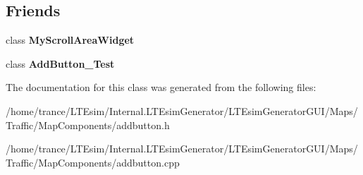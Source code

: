 \subsection*{Friends}
\begin{DoxyCompactItemize}
\item 
class {\bfseries My\+Scroll\+Area\+Widget}\hypertarget{class_add_button_a96efa7b91da8b371cdcf311988e63048}{}\label{class_add_button_a96efa7b91da8b371cdcf311988e63048}

\item 
class {\bfseries Add\+Button\+\_\+\+Test}\hypertarget{class_add_button_a3a5382161c0a9590f097655075ffe7d4}{}\label{class_add_button_a3a5382161c0a9590f097655075ffe7d4}

\end{DoxyCompactItemize}


The documentation for this class was generated from the following files\+:\begin{DoxyCompactItemize}
\item 
/home/trance/\+L\+T\+Esim/\+Internal.\+L\+T\+Esim\+Generator/\+L\+T\+Esim\+Generator\+G\+U\+I/\+Maps/\+Traffic/\+Map\+Components/addbutton.\+h\item 
/home/trance/\+L\+T\+Esim/\+Internal.\+L\+T\+Esim\+Generator/\+L\+T\+Esim\+Generator\+G\+U\+I/\+Maps/\+Traffic/\+Map\+Components/addbutton.\+cpp\end{DoxyCompactItemize}
